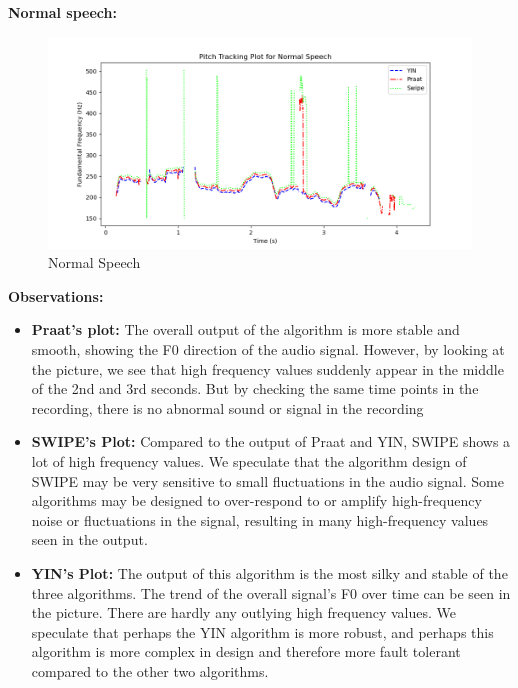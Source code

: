 \documentclass{../labbook}
\begin{document}
\begin{solution}

\textbf{Normal speech:}
\begin{figure}[h]
    \centering
    \includegraphics[width=0.8\linewidth]{recording1_normal_fm_pitch_plot.png}
    \caption{Normal Speech}
    \label{Normal Speech}
\end{figure}

\textbf{Observations:}
\begin{itemize}
    \item \textbf{Praat's plot:} The overall output of the algorithm is more stable and smooth, showing the F0 direction of the audio signal. However, by looking at the picture, we see that high frequency values suddenly appear in the middle of the 2nd and 3rd seconds. But by checking the same time points in the recording, there is no abnormal sound or signal in the recording   

    \item \textbf{SWIPE's Plot:} Compared to the output of Praat and YIN, SWIPE shows a lot of high frequency values. We speculate that the algorithm design of SWIPE may be very sensitive to small fluctuations in the audio signal. Some algorithms may be designed to over-respond to or amplify high-frequency noise or fluctuations in the signal, resulting in many high-frequency values seen in the output.

    \item \textbf{YIN's Plot:} The output of this algorithm is the most silky and stable of the three algorithms. The trend of the overall signal's F0 over time can be seen in the picture. There are hardly any outlying high frequency values. We speculate that perhaps the YIN  algorithm is more robust, and perhaps this algorithm is more complex in design and therefore more fault tolerant compared to the other two algorithms.

\end{itemize}


\end{solution}
\end{document}
